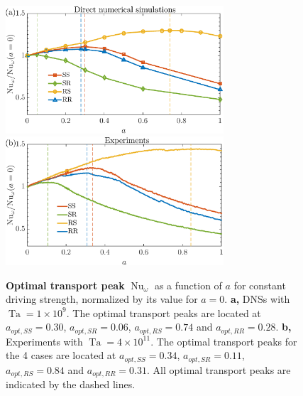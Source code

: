 \documentclass[aps,prl,superscriptaddress,preprint]{revtex4}
\newcommand{\Ta}{\operatorname{Ta}}
\newcommand{\Nu}{\operatorname{Nu}_{\omega}}
\begin{document}
\begin{figure}[!htp]
\begin{center}
   \includegraphics[width=3.2in]{3a.eps}
    \includegraphics[width=3.2in]{3b.eps}
\caption{{\bf Optimal transport peak} $\Nu$ as a function of $a$ for constant driving strength, normalized by its value for $a=0$. {\bf a,} DNSs with $\Ta=1\times 10^9$. The optimal transport peaks are located at  $a_{opt,SS}=0.30$, $a_{opt,SR}=0.06$, $a_{opt,RS}=0.74$ and $a_{opt,RR}=0.28$. {\bf b,}  Experiments with $\Ta=4\times 10^{11} $. The optimal transport peaks for the 4 cases are located at $a_{opt,SS}=0.34$, $a_{opt,SR}=0.11$, $a_{opt,RS}=0.84$ and $a_{opt,RR}=0.31$. All optimal transport peaks are indicated by the dashed lines.}
\label{fig:Nu_a}
\end{center}
\end{figure}


\end{document}
